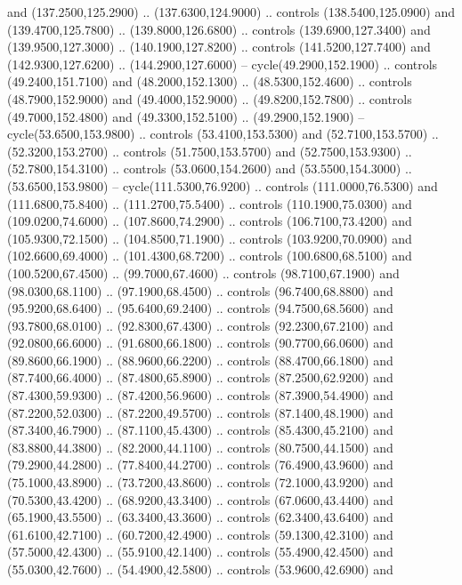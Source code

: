 {\begin{scope}[y=0.80pt, x=0.80pt, yscale=-1, xscale=1, inner sep=0pt, outer sep=0pt, #1]
      and (137.2500,125.2900) .. (137.6300,124.9000) .. controls (138.5400,125.0900)
      and (139.4700,125.7800) .. (139.8000,126.6800) .. controls (139.6900,127.3400)
      and (139.9500,127.3000) .. (140.1900,127.8200) .. controls (141.5200,127.7400)
      and (142.9300,127.6200) .. (144.2900,127.6000) -- cycle(49.2900,152.1900) ..
      controls (49.2400,151.7100) and (48.2000,152.1300) .. (48.5300,152.4600) ..
      controls (48.7900,152.9000) and (49.4000,152.9000) .. (49.8200,152.7800) ..
      controls (49.7000,152.4800) and (49.3300,152.5100) .. (49.2900,152.1900) --
      cycle(53.6500,153.9800) .. controls (53.4100,153.5300) and (52.7100,153.5700)
      .. (52.3200,153.2700) .. controls (51.7500,153.5700) and (52.7500,153.9300) ..
      (52.7800,154.3100) .. controls (53.0600,154.2600) and (53.5500,154.3000) ..
      (53.6500,153.9800) -- cycle(111.5300,76.9200) .. controls (111.0000,76.5300)
      and (111.6800,75.8400) .. (111.2700,75.5400) .. controls (110.1900,75.0300)
      and (109.0200,74.6000) .. (107.8600,74.2900) .. controls (106.7100,73.4200)
      and (105.9300,72.1500) .. (104.8500,71.1900) .. controls (103.9200,70.0900)
      and (102.6600,69.4000) .. (101.4300,68.7200) .. controls (100.6800,68.5100)
      and (100.5200,67.4500) .. (99.7000,67.4600) .. controls (98.7100,67.1900) and
      (98.0300,68.1100) .. (97.1900,68.4500) .. controls (96.7400,68.8800) and
      (95.9200,68.6400) .. (95.6400,69.2400) .. controls (94.7500,68.5600) and
      (93.7800,68.0100) .. (92.8300,67.4300) .. controls (92.2300,67.2100) and
      (92.0800,66.6000) .. (91.6800,66.1800) .. controls (90.7700,66.0600) and
      (89.8600,66.1900) .. (88.9600,66.2200) .. controls (88.4700,66.1800) and
      (87.7400,66.4000) .. (87.4800,65.8900) .. controls (87.2500,62.9200) and
      (87.4300,59.9300) .. (87.4200,56.9600) .. controls (87.3900,54.4900) and
      (87.2200,52.0300) .. (87.2200,49.5700) .. controls (87.1400,48.1900) and
      (87.3400,46.7900) .. (87.1100,45.4300) .. controls (85.4300,45.2100) and
      (83.8800,44.3800) .. (82.2000,44.1100) .. controls (80.7500,44.1500) and
      (79.2900,44.2800) .. (77.8400,44.2700) .. controls (76.4900,43.9600) and
      (75.1000,43.8900) .. (73.7200,43.8600) .. controls (72.1000,43.9200) and
      (70.5300,43.4200) .. (68.9200,43.3400) .. controls (67.0600,43.4400) and
      (65.1900,43.5500) .. (63.3400,43.3600) .. controls (62.3400,43.6400) and
      (61.6100,42.7100) .. (60.7200,42.4900) .. controls (59.1300,42.3100) and
      (57.5000,42.4300) .. (55.9100,42.1400) .. controls (55.4900,42.4500) and
      (55.0300,42.7600) .. (54.4900,42.5800) .. controls (53.9600,42.6900) and

\end{scope}}

